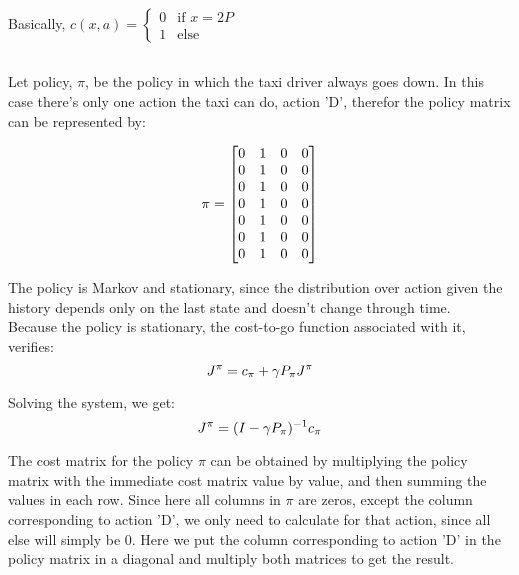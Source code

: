 \documentclass{article}
\begin{document}
\medskip

Basically, $c(x, a) = \left\{\begin{array}{ll}
    0 & \text{if } x = 2P \\
    1 & \text{else}
\end{array}
\right.$

\subsection{}

Let policy, $\pi$, be the policy in which the taxi driver always goes down. In this case there's only one action the taxi can do, action 'D',
therefor the policy matrix can be represented by: 

\begin{equation}
    \notag
    \pi = \begin{bmatrix}
        0 & 1 & 0 & 0 \\
        0 & 1 & 0 & 0 \\
        0 & 1 & 0 & 0 \\
        0 & 1 & 0 & 0 \\
        0 & 1 & 0 & 0 \\
        0 & 1 & 0 & 0 \\
        0 & 1 & 0 & 0 \\
    \end{bmatrix}
\end{equation}

The policy is Markov and stationary, since the distribution over action given the history depends only on the last state and
doesn't change through time. \\

Because the policy is stationary, the cost-to-go function associated with it, verifies:
\begin{equation}
    \notag
    J^\pi = c_\pi + {\gamma}P_{\pi}J^{\pi}
\end{equation}

Solving the system, we get:
\begin{equation}
    \notag
    J^\pi = {(I - {\gamma}P_{\pi})^{-1}}c_\pi
\end{equation}

\medskip

The cost matrix for the policy $\pi$ can be obtained by multiplying the policy matrix with the immediate cost matrix value by value, and then summing the values in each row.
Since here all columns in $\pi$ are zeros, except the column corresponding to action 'D', we only need to calculate for that action, since all else will simply be 0. Here we put the column corresponding to action 'D' in the policy matrix in a diagonal and multiply both matrices to get the result.
\end{document}
